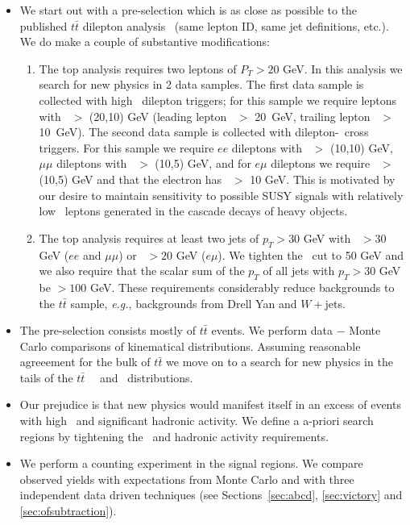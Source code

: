 \begin{itemize}

\item We start out with a pre-selection which is as close as 
possible to the published $t\bar{t}$
dilepton analysis~\cite{ref:top} (same lepton ID, same jet definitions,
etc.).  We do make a couple of substantive modifications:

\begin{enumerate}
\item The top analysis requires two leptons of $P_T > 20$ GeV.  
In this analysis we search for new physics in 2 data samples. The first data
sample is collected with high \pt\ dilepton triggers; for this sample we require
leptons with \pt\ $>$ (20,10) GeV (leading lepton \pt\ $>$ 20~GeV,
trailing lepton \pt\ $>$ 10~GeV). The second data sample is collected
with dilepton-\Ht\ cross triggers. For this sample we require $ee$ dileptons
with \pt\ $>$ (10,10) GeV, $\mu\mu$ dileptons with \pt\ $>$ (10,5) GeV, and for $e\mu$
dileptons we require \pt\ $>$ (10,5) GeV and that the electron has \pt\ $>$ 10 GeV.  
This is motivated by our desire to maintain sensitivity to possible
SUSY signals with relatively low \pt\ leptons generated in the 
cascade decays of heavy objects.
\item The top analysis requires at least two jets of $p_T > 30$
GeV with \met\ $>30$ GeV ($ee$ and $\mu\mu$) or \met\ $>20$ GeV ($e\mu$).
We tighten the \met\ cut to 50 GeV and we 
also require that the scalar sum of the $p_T$ of all jets with $p_T > 30$
GeV be $> 100$ GeV.  These requirements considerably
reduce backgrounds to the $t\bar{t}$ sample, {\em e.g.}, backgrounds
from Drell Yan and $W+$jets.
\end{enumerate}

\item The pre-selection consists mostly of $t\bar{t}$ events.  We perform 
data $-$ Monte Carlo comparisons of kinematical distributions.  Assuming
reasonable agreeement for the bulk of $t\bar{t}$ we move on to a 
search for new physics in the tails of the $t\bar{t}$ \ \met\ and \Ht\ distributions.

\item Our prejudice is that new physics would manifest itself in an
excess of events with high \met\ and significant hadronic activity.
We define a a-priori search regions by tightening the \met\ and 
hadronic activity requirements.

\item We perform a counting experiment in the signal regions.  We compare
observed yields with expectations from Monte Carlo and with three independent
data driven techniques (see Sections~\ref{sec:abcd}, \ref{sec:victory} and \ref{sec:ofsubtraction}).

\end{itemize}



